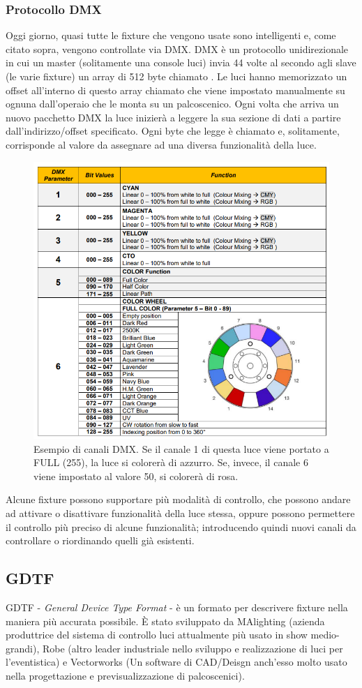 \documentclass[main.tex]{subfiles}
\begin{document}
\subsubsection{Protocollo DMX}\label{subsec:1_1_dmx}
Oggi giorno, quasi tutte le fixture che vengono usate sono intelligenti e, come citato sopra, vengono controllate via DMX. DMX è un protocollo unidirezionale in cui un master (solitamente una console luci) invia 44 volte al secondo agli slave (le varie fixture) un array di 512 byte chiamato . Le luci hanno memorizzato un offset all'interno di questo array chiamato  che viene impostato manualmente su ognuna dall'operaio che le monta su un palcoscenico. Ogni volta che arriva un nuovo pacchetto DMX la luce inizierà a leggere la sua sezione di dati a partire dall'indirizzo/offset specificato. Ogni byte che legge è chiamato  e, solitamente, corrisponde al valore da assegnare ad una diversa funzionalità della luce.
\begin{figure}[H]
    \centering
    \includegraphics[width=0.65\linewidth]{img/introduzione/dmxChannelDescExample.png}
    \caption{Esempio di canali DMX. Se il canale 1 di questa luce viene portato a FULL (255), la luce si colorerà di azzurro. Se, invece, il canale 6 viene impostato al valore 50, si colorerà di rosa.}
    \label{fig:dmxChannelsExample}
\end{figure}

Alcune fixture possono supportare più modalità di controllo, che possono andare ad attivare o disattivare funzionalità della luce stessa, oppure possono permettere il controllo più preciso di alcune funzionalità; introducendo quindi nuovi canali da controllare o riordinando quelli già esistenti. 


\subsection{GDTF}\label{subsec:1_gdtf}
GDTF - \textit{General Device Type Format} - è un formato per descrivere fixture nella maniera più accurata possibile. È stato sviluppato da MAlighting (azienda produttrice del sistema di controllo luci attualmente più usato in show medio-grandi), Robe (altro leader industriale nello sviluppo e realizzazione di luci per l'eventistica) e Vectorworks (Un software di CAD/Deisgn anch'esso molto usato nella progettazione e previsualizzazione di palcoscenici). 
\newline
\end{document}
